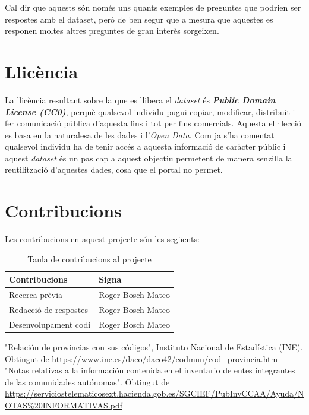 \documentclass[12pt]{article}
\begin{document}
Cal dir que aquests són només uns quants exemples de preguntes que podrien ser respostes amb el dataset, però de ben segur que a mesura que aquestes es responen moltes altres preguntes de gran interès sorgeixen.


\section*{Llicència}
La llicència resultant sobre la que es llibera el \textit{dataset} és \textit{\textbf{Public Domain License (CC0)}}, perquè qualsevol individu pugui copiar, modificar, distribuit i fer comunicació pública d'aquesta fins i tot per fins comercials.
Aquesta el·lecció es basa en la naturalesa de les dades i l'\textit{Open Data}. Com ja s'ha comentat qualsevol individu ha de tenir accés a aquesta informació de caràcter públic i aquest \textit{dataset} és un pas cap a aquest objectiu permetent de manera senzilla la reutilització d'aquestes dades, cosa que el portal no permet.

\newpage
\section*{Contribucions}
Les contribucions en aquest projecte són les següents:
\begin{table}[h!]
    \centering
     \begin{tabular}{p{5cm}p{5cm}} 
     \hline
     \textbf{Contribucions} & \textbf{Signa} \\
     \hline
     Recerca prèvia & Roger Bosch Mateo \\
     Redacció de respostes & Roger Bosch Mateo \\
     Desenvolupament codi & Roger Bosch Mateo \\
     \hline
    \end{tabular}
    \caption{Taula de contribucions al projecte}
    \label{ComparativaAPITwitter}
\end{table}

\newpage
\begin{thebibliography}{9}
    "Relación de provincias con sus códigos", Instituto Nacional de Estadística (INE). Obtingut de \url{https://www.ine.es/daco/daco42/codmun/cod_provincia.htm}
    "Notas relativas a la información contenida en el inventario de entes integrantes de las comunidades autónomas". Obtingut de \url{https://serviciostelematicosext.hacienda.gob.es/SGCIEF/PubInvCCAA/Ayuda/NOTAS\%20INFORMATIVAS.pdf}
\end{thebibliography}
\end{document}
